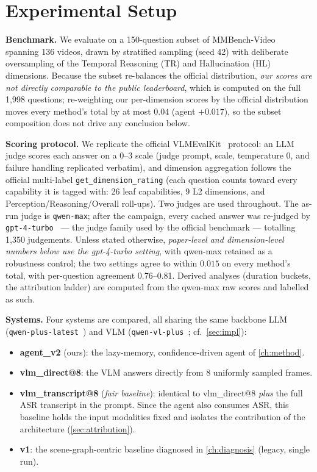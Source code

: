 \section{Experimental Setup}
\label{sec:setup}

\textbf{Benchmark.} We evaluate on a 150-question subset of
MMBench-Video~\cite{fang2024mmbenchvideo} spanning 136 videos, drawn by stratified
sampling (seed 42) with deliberate oversampling of the Temporal Reasoning (TR) and
Hallucination (HL) dimensions. Because the subset re-balances the official
distribution, \emph{our scores are not directly comparable to the public
leaderboard}, which is computed on the full 1{,}998 questions; re-weighting our
per-dimension scores by the official distribution moves every method's total by at
most $0.04$ (agent $+0.017$), so the subset composition does not drive any
conclusion below.

\textbf{Scoring protocol.} We replicate the official
VLMEvalKit~\cite{duan2024vlmevalkit} protocol: an LLM judge scores each answer on a
0--3 scale (judge prompt, scale, temperature $0$, and failure handling replicated
verbatim), and dimension aggregation follows the official multi-label
\texttt{get\_dimension\_rating} (each question counts toward every capability it is
tagged with: 26 leaf capabilities, 9 L2 dimensions, and Perception/Reasoning/Overall
roll-ups). Two judges are used throughout. The as-run judge is
\texttt{qwen-max}; after the campaign, every cached answer was re-judged by
\texttt{gpt-4-turbo}~\cite{openai2023gpt4} --- the judge family used by the official
benchmark --- totalling 1{,}350 judgements. Unless stated otherwise,
\emph{paper-level and dimension-level numbers below use the gpt-4-turbo setting},
with qwen-max retained as a robustness control; the two settings agree to within
$0.015$ on every method's total, with per-question agreement 0.76--0.81. Derived
analyses (duration buckets, the attribution ladder) are computed from the qwen-max
raw scores and labelled as such.

\textbf{Systems.} Four systems are compared, all sharing the same backbone LLM
(\texttt{qwen-plus-latest}~\cite{bai2023qwen}) and VLM
(\texttt{qwen-vl-plus}~\cite{bai2023qwenvl}; cf.\ \cref{sec:impl}):
\begin{itemize}
  \item \textbf{agent\_v2} (ours): the lazy-memory, confidence-driven agent of
  \cref{ch:method}.
  \item \textbf{vlm\_direct@8}: the VLM answers directly from 8 uniformly sampled
  frames.
  \item \textbf{vlm\_transcript@8} (\emph{fair baseline}): identical to
  vlm\_direct@8 \emph{plus} the full ASR transcript in the prompt. Since the agent
  also consumes ASR, this baseline holds the input modalities fixed and isolates
  the contribution of the architecture (\cref{sec:attribution}).
  \item \textbf{v1}: the scene-graph-centric baseline diagnosed in
  \cref{ch:diagnosis} (legacy, single run).
\end{itemize}

